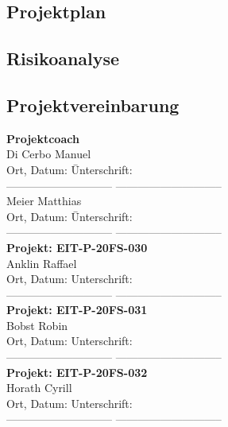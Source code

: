 \subsection{Projektplan}\label{subsec:Projektplan}


\subsection{Risikoanalyse}\label{subsec:Risikoanalyse}




\subsection{Projektvereinbarung}\label{subsec:Projektvereinbarung}

	\begin{tabbing}
		\textbf{Projektcoach}\\[0.2cm]
		Di Cerbo Manuel\\[0.2cm]
		Ort, Datum: \hspace{5cm}\=Unterschrift:
		\\[0.5cm]----------------------------- \>-----------------------------
		\\[0.2cm]
		Meier Matthias\\[0.2cm]
		Ort, Datum: \hspace{5cm}\=Unterschrift:
		\\[0.5cm]----------------------------- \>-----------------------------
		\\[1cm]
		\textbf{Projekt: EIT-P-20FS-030}\\[0.2cm]
		Anklin Raffael\\[0.2cm]
		Ort, Datum: \>Unterschrift:
		\\[0.5cm]----------------------------- \>-----------------------------
		\\[0.2cm]
		\textbf{Projekt: EIT-P-20FS-031}\\[0.2cm]		
		Bobst Robin\\[0.2cm]
		Ort, Datum: \>Unterschrift:
		\\[0.5cm]----------------------------- \>-----------------------------
		\\[0.2cm]
		\textbf{Projekt: EIT-P-20FS-032}\\[0.2cm]
		Horath Cyrill\\[0.2cm]
		Ort, Datum: \>Unterschrift:
		\\[0.5cm]----------------------------- \>-----------------------------
	\end{tabbing}
	
	\clearpage
